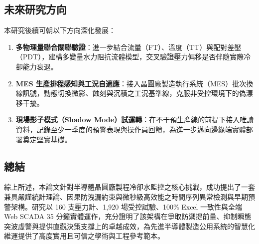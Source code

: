 \documentclass[fontset=none, a4paper, 12pt]{ctexart}
\begin{document}
\subsection{未來研究方向}
本研究後續可朝以下方向深化發展：
\begin{enumerate}
    \item \textbf{多物理量聯合關聯驗證}：進一步結合流量（FT）、溫度（TT）與配對差壓（PDT），建構多變量水力阻抗流體模型，交叉驗證壓力偏移是否伴隨實際冷卻能力衰退。
    \item \textbf{MES 生產排程感知與工況自適應}：接入晶圓廠製造執行系統（MES）批次換線訊號，動態切換微影、蝕刻與沉積之工況基準線，克服非受控環境下的偽漂移干擾。
    \item \textbf{現場影子模式（Shadow Mode）試運轉}：在不干預生產線的前提下接入唯讀資料，記錄至少一季度的預警表現與操作員回饋，為進一步邁向邊緣端實體部署奠定堅實基礎。
\end{enumerate}

\subsection{總結}
綜上所述，本論文針對半導體晶圓廠製程冷卻水監控之核心挑戰，成功提出了一套兼具嚴謹統計理論、因果防洩漏約束與微秒級高效能之時間序列異常檢測與早期預警架構。研究以 160 支壓力計、1,920 場受控試驗、100\% Excel 一致性與全端 Web SCADA 35 分鐘實體運作，充分證明了該架構在爭取防禦提前量、抑制瞬態突波虛警與提供直觀決策支撐上的卓越成效，為先進半導體製造公用系統的智慧化維運提供了高度實用且可信之學術與工程參考範本。

\newpage


\end{document}
